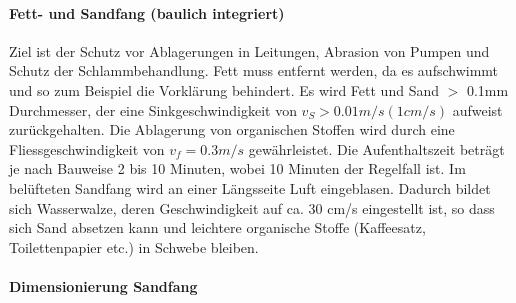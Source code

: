 \documentclass[9pt, openright=false]{scrartcl}
\begin{document}
\paragraph{Fett- und Sandfang (baulich integriert)} Ziel ist der Schutz vor Ablagerungen in Leitungen, Abrasion von Pumpen und Schutz der Schlammbehandlung. Fett muss entfernt werden, da es aufschwimmt und so zum Beispiel die Vorklärung behindert. Es wird Fett und Sand $>$ 0.1mm Durchmesser, der eine Sinkgeschwindigkeit von $v_S > 0.01 m/s (1 cm/s)$ aufweist zurückgehalten. Die Ablagerung von organischen Stoffen wird durch eine Fliessgeschwindigkeit von $v_f = 0.3 m/s$ gewährleistet. Die Aufenthaltszeit beträgt je nach Bauweise 2 bis 10 Minuten, wobei 10 Minuten der Regelfall ist. Im belüfteten Sandfang wird an einer Längsseite Luft eingeblasen. Dadurch bildet sich Wasserwalze, deren Geschwindigkeit auf ca. 30 cm/s eingestellt ist, so dass sich Sand absetzen kann und leichtere organische Stoffe (Kaffeesatz, Toilettenpapier etc.) in Schwebe bleiben.\paragraph{Dimensionierung Sandfang} 
\end{document}
